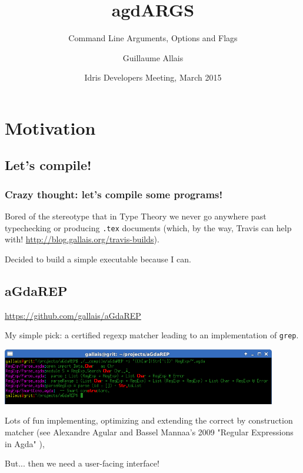 \documentclass[dvipsnames]{beamer}
\title{agdARGS}
\subtitle{Command Line Arguments, Options and Flags}
\author[G. Allais]{Guillaume Allais}
\institute[Strathclyde]{University of Strathclyde}
\date[IDM, March 2015]{Idris Developers Meeting, March 2015}
\begin{document}
\begin{frame}
 \maketitle
\end{frame}

\section{Motivation}
\subsection{Let's compile!}

\begin{frame}
 \frametitle{Crazy thought: let's compile some programs!}

  Bored of the stereotype that in Type Theory we never go anywhere
  past typechecking or producing \texttt{.tex} documents (which,
  by the way, Travis can help with! \url{http://blog.gallais.org/travis-builds}).

  \vspace{0.7cm}

  Decided to build a simple executable because I can.
\end{frame}

\subsection{aGdaREP}

\begin{frame}{\url{https://github.com/gallais/aGdaREP}}

  My simple pick: a certified regexp matcher leading to an
  implementation of \texttt{grep}.

 \begin{center}
   \includegraphics[width=0.9\textwidth]{screenshot.png}
 \end{center}

  Lots of fun implementing, optimizing and extending the correct by
  construction matcher (see Alexandre Agular and Bassel Mannaa's 2009
  "Regular Expressions in Agda" ),

  But... then we need a user-facing interface!
\end{frame}
\end{document}
